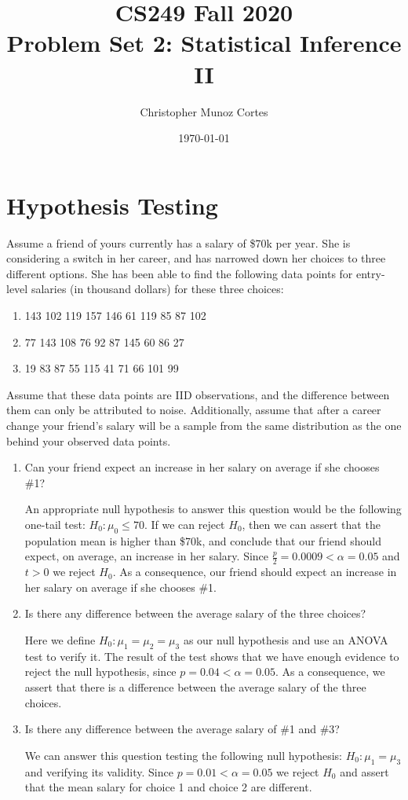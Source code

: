 \documentclass{article}
\title{CS249 Fall 2020\\
       Problem Set 2: Statistical Inference II}
\author{Christopher Munoz Cortes}
\date{\today}
\begin{document}
\maketitle

\section{Hypothesis Testing}
Assume a friend of yours currently has a salary of \$70k per year. She is
considering a switch in her career, and has narrowed down her choices to
three different options. She has been able to find the following data points
for entry-level salaries (in thousand dollars) for these three choices:
\begin{enumerate}
\item 143 102 119 157 146 61 119 85 87 102
\item 77 143 108 76 92 87 145 60 86 27
\item 19 83 87 55 115 41 71 66 101 99
\end{enumerate}
Assume that these data points are IID observations, and the difference between 
them can only be attributed to noise. Additionally, assume that after
a career change your friend’s salary will be a sample from the same distribution 
as the one behind your observed data points.
\begin{enumerate}[label={(\alph*)}]
    \item Can your friend expect an increase in her salary on average if she
    chooses \#1?
    
    An appropriate null hypothesis to answer this question would be the following
    one-tail test: $H_0: \mu_0 \leq 70$. If we can reject $H_0$, then we can assert
    that the population mean is higher than \$70k, and conclude that our friend
    should expect, on average, an increase in her salary. 
    Since $\frac{p}{2} = 0.0009 < \alpha = 0.05$
    and $t>0$ we reject $H_0$. As a consequence, our friend should expect an
    increase in her salary on average if she chooses \#1.
    
    \item Is there any difference between the average salary of the three 
    choices?
    
    Here we define $H_0: \mu_1 = \mu_2 = \mu_3$ as our null hypothesis and use an 
    ANOVA test to verify it. The result of the test shows that we have enough evidence
    to reject the null hypothesis, since $p = 0.04 < \alpha = 0.05$. As a
    consequence, we assert that there is a difference between the average salary of
    the three choices.
    
    \item Is there any difference between the average salary of \#1 and \#3?
    
    We can answer this question testing the following null hypothesis: $H_0: \mu_1
    = \mu_3$ and verifying its validity. Since $p = 0.01 < \alpha = 0.05$ we reject 
    $H_0$ and assert that the mean salary for choice 1 and choice 2 are different.
\end{enumerate}
\end{document}
